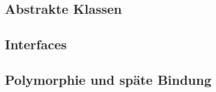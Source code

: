 \subsection{Abstrakte Klassen} \imperativeMark \oopMark

\subsection{Interfaces} \imperativeMark \oopMark

\subsection{Polymorphie und späte Bindung} \imperativeMark \oopMark
